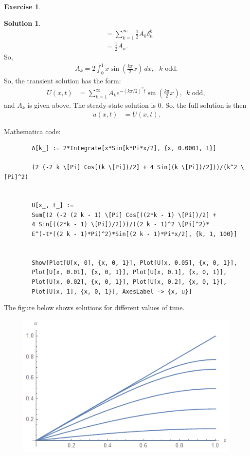 \documentclass{book}
\theoremstyle{definition}
\newtheorem*{exer*}{Exercise}
\newtheorem*{sln*}{Solution}
\begin{document}
\begin{exer*}
\begin{sln*}
\begin{align*}
		&= \sum_{k=1}^\infty \frac{1}{2}A_k\delta^k_n\\
		&= \frac{1}{2}A_n.
		\end{align*}
		So,
		\begin{align*}
		A_k = 2\int_{0}^1x\sin\left(\frac{k\pi}{2} x\right)\,dx,\,\,\,\, k \text{ odd}.
		\end{align*}
		So, the transient solution has the form:
		\begin{align*}
		U(x,t) &= \sum_{k=1}^\infty A_k e^{-(k\pi/2)^2t} \sin\left(\frac{k\pi}{2} x\right),\,\,\, k \text{ odd},
		\end{align*}
		and $A_k$ is given above. The steady-state solution is 0. So, the full solution is then
		\begin{align*}
		u(x,t) &= U(x,t).
		\end{align*}
		
		\noindent Mathematica code:
		\begin{lstlisting}
		A[k_] := 2*Integrate[x*Sin[k*Pi*x/2], {x, 0.0001, 1}]
		
		(2 (-2 k \[Pi] Cos[(k \[Pi])/2] + 4 Sin[(k \[Pi])/2]))/(k^2 \[Pi]^2)
		
		
		U[x_, t_] := 
		Sum[(2 (-2 (2 k - 1) \[Pi] Cos[((2*k - 1) \[Pi])/2] + 
		4 Sin[((2*k - 1) \[Pi])/2]))/((2 k - 1)^2 \[Pi]^2)*
		E^(-t*((2 k - 1)*Pi)^2)*Sin[(2 k - 1)*Pi*x/2], {k, 1, 100}]
		
		
		Show[Plot[U[x, 0], {x, 0, 1}], Plot[U[x, 0.05], {x, 0, 1}], 
		Plot[U[x, 0.01], {x, 0, 1}], Plot[U[x, 0.1], {x, 0, 1}], 
		Plot[U[x, 0.02], {x, 0, 1}], Plot[U[x, 0.2], {x, 0, 1}], 
		Plot[U[x, 1], {x, 0, 1}], AxesLabel -> {x, u}]
		\end{lstlisting}
		
		\newpage
		\noindent The figure below shows solutions for different values of time.\\
		
		\begin{figure}[h!]
			\centering
			\includegraphics[scale=0.7]{pset2_2.png}
		\end{figure}
		

\end{sln*}
\end{exer*}
\end{document}

